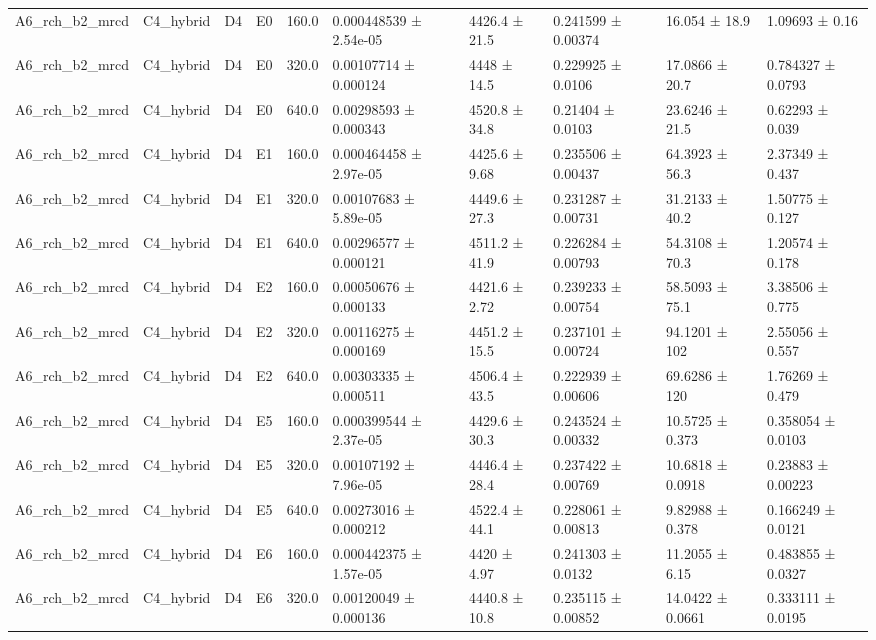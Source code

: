 \begin{table}
\begin{tabular}{llllllllll}
A6\_rch\_b2\_mrcd & C4\_hybrid & D4 & E0 & 160.0 & 0.000448539 ± 2.54e-05 & 4426.4 ± 21.5 & 0.241599 ± 0.00374 & 16.054 ± 18.9 & 1.09693 ± 0.16 \\
A6\_rch\_b2\_mrcd & C4\_hybrid & D4 & E0 & 320.0 & 0.00107714 ± 0.000124 & 4448 ± 14.5 & 0.229925 ± 0.0106 & 17.0866 ± 20.7 & 0.784327 ± 0.0793 \\
A6\_rch\_b2\_mrcd & C4\_hybrid & D4 & E0 & 640.0 & 0.00298593 ± 0.000343 & 4520.8 ± 34.8 & 0.21404 ± 0.0103 & 23.6246 ± 21.5 & 0.62293 ± 0.039 \\
A6\_rch\_b2\_mrcd & C4\_hybrid & D4 & E1 & 160.0 & 0.000464458 ± 2.97e-05 & 4425.6 ± 9.68 & 0.235506 ± 0.00437 & 64.3923 ± 56.3 & 2.37349 ± 0.437 \\
A6\_rch\_b2\_mrcd & C4\_hybrid & D4 & E1 & 320.0 & 0.00107683 ± 5.89e-05 & 4449.6 ± 27.3 & 0.231287 ± 0.00731 & 31.2133 ± 40.2 & 1.50775 ± 0.127 \\
A6\_rch\_b2\_mrcd & C4\_hybrid & D4 & E1 & 640.0 & 0.00296577 ± 0.000121 & 4511.2 ± 41.9 & 0.226284 ± 0.00793 & 54.3108 ± 70.3 & 1.20574 ± 0.178 \\
A6\_rch\_b2\_mrcd & C4\_hybrid & D4 & E2 & 160.0 & 0.00050676 ± 0.000133 & 4421.6 ± 2.72 & 0.239233 ± 0.00754 & 58.5093 ± 75.1 & 3.38506 ± 0.775 \\
A6\_rch\_b2\_mrcd & C4\_hybrid & D4 & E2 & 320.0 & 0.00116275 ± 0.000169 & 4451.2 ± 15.5 & 0.237101 ± 0.00724 & 94.1201 ± 102 & 2.55056 ± 0.557 \\
A6\_rch\_b2\_mrcd & C4\_hybrid & D4 & E2 & 640.0 & 0.00303335 ± 0.000511 & 4506.4 ± 43.5 & 0.222939 ± 0.00606 & 69.6286 ± 120 & 1.76269 ± 0.479 \\
A6\_rch\_b2\_mrcd & C4\_hybrid & D4 & E5 & 160.0 & 0.000399544 ± 2.37e-05 & 4429.6 ± 30.3 & 0.243524 ± 0.00332 & 10.5725 ± 0.373 & 0.358054 ± 0.0103 \\
A6\_rch\_b2\_mrcd & C4\_hybrid & D4 & E5 & 320.0 & 0.00107192 ± 7.96e-05 & 4446.4 ± 28.4 & 0.237422 ± 0.00769 & 10.6818 ± 0.0918 & 0.23883 ± 0.00223 \\
A6\_rch\_b2\_mrcd & C4\_hybrid & D4 & E5 & 640.0 & 0.00273016 ± 0.000212 & 4522.4 ± 44.1 & 0.228061 ± 0.00813 & 9.82988 ± 0.378 & 0.166249 ± 0.0121 \\
A6\_rch\_b2\_mrcd & C4\_hybrid & D4 & E6 & 160.0 & 0.000442375 ± 1.57e-05 & 4420 ± 4.97 & 0.241303 ± 0.0132 & 11.2055 ± 6.15 & 0.483855 ± 0.0327 \\
A6\_rch\_b2\_mrcd & C4\_hybrid & D4 & E6 & 320.0 & 0.00120049 ± 0.000136 & 4440.8 ± 10.8 & 0.235115 ± 0.00852 & 14.0422 ± 0.0661 & 0.333111 ± 0.0195 \\

\end{tabular}
\end{table}
